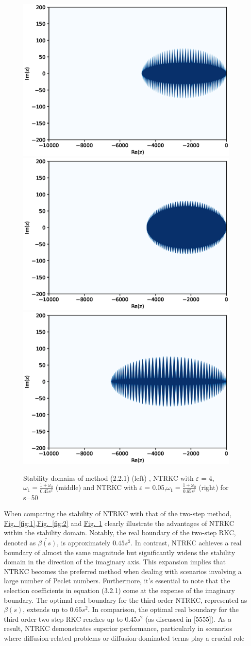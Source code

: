 \documentclass[review]{elsarticle}
\newcommand{\figref}[1]{\hyperref[#1]{Fig.~\ref*{#1}}}
\begin{document}
\begin{figure}[ht]
    \centering
    \includegraphics[width=0.3\linewidth]{stable_domians/twostepRKCs100.eps}
    \hfill
    \includegraphics[width=0.3\linewidth]{stable_domians/NTRCKs100wide.eps}
    \hfill
    \includegraphics[width=0.3\linewidth]{stable_domians/NTRCKs100long.eps}
    \caption{Stability domains of method (2.2.1) (left) , NTRKC  with $\varepsilon$ = 4,$\omega_1=\frac{1+\omega_0}{0.45s^2}$ (middle) and  NTRKC  with $\varepsilon$ = 0.05,$\omega_1=\frac{1+\omega_0}{0.65s^2}$ (right) for s=50}
    \label{fig:3}
\end{figure}


When comparing the stability of NTRKC with that of the two-step method,  \figref{fig:1},\figref{fig:2} and \figref{fig:3} clearly illustrate the advantages of NTRKC within the stability domain. Notably, the real boundary of the two-step RKC, denoted as $\tilde{\beta(s)}$, is approximately $0.45s^2$.
 In contrast, NTRKC achieves a real boundary of almost the same magnitude but significantly widens the stability domain in the direction of the imaginary axis. This expansion implies that NTRKC becomes the preferred method when dealing with scenarios involving a large number of Peclet numbers.
Furthermore, it's essential to note that the selection coefficients in equation (3.2.1) come at the expense of the imaginary boundary. The optimal real boundary for the third-order NTRKC, represented as $\beta(s)$, extends up to $0.65s^2$. 
In comparison, the optimal real boundary for the third-order two-step RKC reaches up to $0.45s^2$ (as discussed in [5555]). As a result, NTRKC demonstrates superior performance, particularly in scenarios where diffusion-related problems or diffusion-dominated terms play a crucial role
\end{document}

